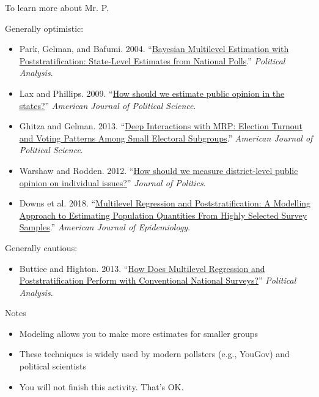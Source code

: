 \documentclass[aspectratio=169]{beamer}
\begin{document}
\begin{frame}{To learn more about Mr. P.}

{\footnotesize
Generally optimistic:
\begin{itemize}
\item Park, Gelman, and Bafumi. 2004. ``\textcolor{blue}{\href{https://www.jstor.org/stable/25791784}{Bayesian Multilevel Estimation with Poststratification: State-Level Estimates from National Polls}}.'' \textit{Political Analysis}.
\item Lax and Phillips. 2009. ``\textcolor{blue}{\href{https://www.jstor.org/stable/25193870}{How should we estimate public opinion in the states?}}'' \textit{American Journal of Political Science}.
\item Ghitza and Gelman. 2013. ``\textcolor{blue}{\href{https://www.jstor.org/stable/23496652}{Deep Interactions with MRP: Election Turnout and Voting Patterns Among Small Electoral Subgroups}}.'' \textit{American Journal of Political Science}.
\item Warshaw and Rodden. 2012. ``\textcolor{blue}{\href{http://www.jstor.org/stable/10.1017/s0022381611001204}{How should we measure district-level public opinion on individual issues?}}'' \textit{Journal of Politics}.
\item Downs et al. 2018. ``\textcolor{blue}{\href{https://doi.org/10.1093/aje/kwy070}{Multilevel Regression and Poststratification: A Modelling Approach to Estimating Population Quantities From Highly Selected Survey Samples}}.'' \textit{American Journal of Epidemiology}.
\end{itemize}
Generally cautious:
\begin{itemize}
\item Buttice and Highton. 2013. ``\textcolor{blue}{\href{http://www.jstor.org/stable/24572674}{How Does Multilevel Regression and Poststratification Perform with Conventional National Surveys?}}'' \textit{Political Analysis}.
\end{itemize}
}

\end{frame}
\begin{frame}{Notes}

\begin{itemize}
\item Modeling allows you to make more estimates for smaller groups \pause
\item These techniques is widely used by modern pollsters (e.g., YouGov) and political scientists \pause
\item You will not finish this activity.  That's OK.
\end{itemize}
\end{frame}
\end{document}
